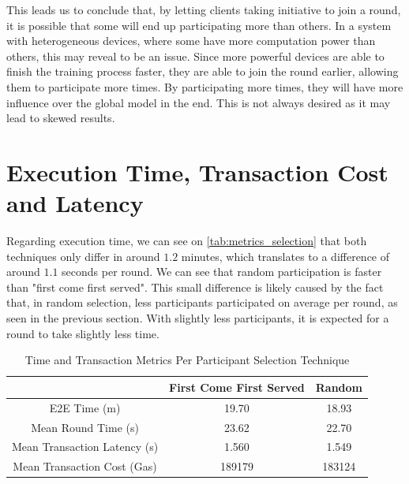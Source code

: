 This leads us to conclude that, by letting clients taking initiative to join a round, it is possible that some will end up participating more than others. In a system with heterogeneous devices, where some have more computation power than others, this may reveal to be an issue. Since more powerful devices are able to finish the training process faster, they are able to join the round earlier, allowing them to participate more times. By participating more times, they will have more influence over the global model in the end. This is not always desired as it may lead to skewed results.

\section{Execution Time, Transaction Cost and Latency}

Regarding execution time, we can see on \autoref{tab:metrics_selection} that both techniques only differ in around $1.2$ minutes, which translates to a difference of around $1.1$ seconds per round. We can see that random participation is faster than "first come first served". This small difference is likely caused by the fact that, in random selection, less participants participated on average per round, as seen in the previous section. With slightly less participants, it is expected for a round to take slightly less time.

\begin{table}[!ht]
\begin{tabular}{c|c|c} \hline \hline
                              & First Come First Served & Random \\ \hline \hline
E2E Time (m)                   & 19.70                   & 18.93  \\ \hline
Mean Round Time (s)            & 23.62                   & 22.70  \\ \hline
Mean Transaction Latency (s)   & 1.560                   & 1.549  \\ \hline
Mean Transaction Cost (Gas)    & 189179                  & 183124 \\ \hline
\end{tabular}
\caption{Time and Transaction Metrics Per Participant Selection Technique}
\label{tab:metrics_selection}
\end{table}

